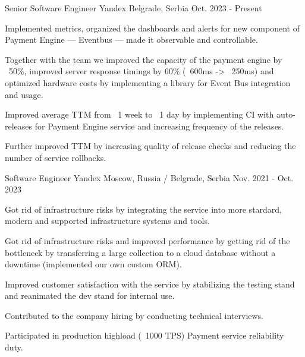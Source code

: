 

\begin{cventries}

  \cventry
    {Senior Software Engineer} %
    {Yandex} %
    {Belgrade, Serbia} %
    {Oct. 2023 - Present} %
    {
      \begin{cvitems} %
        \item {Implemented metrics, organized the dashboards and alerts for new component of Payment Engine — Eventbus — made it observable and controllable.}
        \item {Together with the team we improved the capacity of the payment engine by ~50\%, improved server response timings by 60\% (~600ms -> ~250ms) and optimized hardware costs by implementing a library for Event Bus integration and usage.}
        \item {Improved average TTM from ~1 week to ~1 day by implementing CI with auto-releases for Payment Engine service and increasing frequency of the releases.}
        \item {Further improved TTM by increasing quality of release checks and reducing the number of service rollbacks.}
      \end{cvitems}
    }
  \cventry
    {Software Engineer} %
    {Yandex} %
    {Moscow, Russia / Belgrade, Serbia} %
    {Nov. 2021 - Oct. 2023} %
    {
      \begin{cvitems} %
        \item {Got rid of infrastructure risks by integrating the service into more stardard, modern and supported infrastructure systems and tools.}
        \item {Got rid of infrastructure risks and improved performance by getting rid of the bottleneck by transferring a large collection to a cloud database without a downtime (implemented our own custom ORM).}
        \item {Improved customer satisfaction with the service by stabilizing the testing stand and reanimated the dev stand for internal use.}
        \item {Contributed to the company hiring by conducting technical interviews.}
        \item {Participated in production highload (~1000 TPS) Payment service reliability duty.}
      \end{cvitems}
}


\end{cventries}
